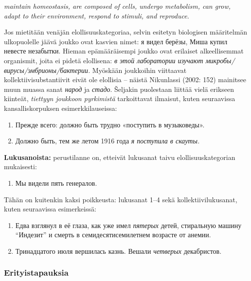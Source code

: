 \documentclass[]{scrartcl}
\providecommand{\tightlist}{%
  \setlength{\itemsep}{0pt}\setlength{\parskip}{0pt}}
\begin{document}
\emph{maintain homeostasis, are composed of cells, undergo metabolism,
can grow, adapt to their environment, respond to stimuli, and
reproduce.}

Jos mietitään venäjän elollisuuskategoriaa, selvin esitetyn biologisen
määritelmän ulkopuolelle jäävä joukko ovat kasvien nimet: я видел
берёзы, Миша купил невесте незабытки. Hieman epämääräisempi joukko ovat
erilaiset alkeellisemmat organismit, joita ei pidetä elollisena: \emph{в
этой лаборатории изучают микробы/вирусы/эмбрионы/бактерии.} Myöskään
joukkoihin viittaavat kollektiivisubstantiivit eivät ole elollisia --
näistä Nikunlassi (2002: 152) mainitsee muun muassa sanat \emph{народ}
ja \emph{стадо}. Šeljakin puolestaan liittää vielä erikseen kiinteät,
\emph{tiettyyn joukkoon pyrkimistä} tarkoittavat ilmaisut, kuten
seuraavissa kansalliskorpuksen esimerkkilauseissa:

\begin{enumerate}
\def\labelenumi{(\arabic{enumi})}
\setcounter{enumi}{110}
\tightlist
\item
  Прежде всего: должно быть трудно «поступить в музыковеды».
\item
  Должно быть, тем же летом 1916 года \emph{я поступила в скауты.}
\end{enumerate}

\textbf{Lukusanoista:} perustilanne on, etteivät lukusanat taivu
elollisuuskategorian mukaisesti:

\begin{enumerate}
\def\labelenumi{(\arabic{enumi})}
\setcounter{enumi}{112}
\tightlist
\item
  Мы видели пять генералов.
\end{enumerate}

Tähän on kuitenkin kaksi poikkeusta: lukusanat 1--4 sekä
kollektiivilukusanat, kuten seuraavissa esimerkeissä:

\begin{enumerate}
\def\labelenumi{(\arabic{enumi})}
\setcounter{enumi}{113}
\tightlist
\item
  Едва взглянул в её глаза, как уже имел \emph{пятерых} детей,
  стиральную машину ``Индезит'' и смерть в семидесятисемилетнем возрасте
  от анемии.
\item
  Тринадцатого июля вершилась казнь. Вешали \emph{четверых} декабристов.
\end{enumerate}

\subsubsection{Erityistapauksia}\label{erityistapauksia}
\end{document}
